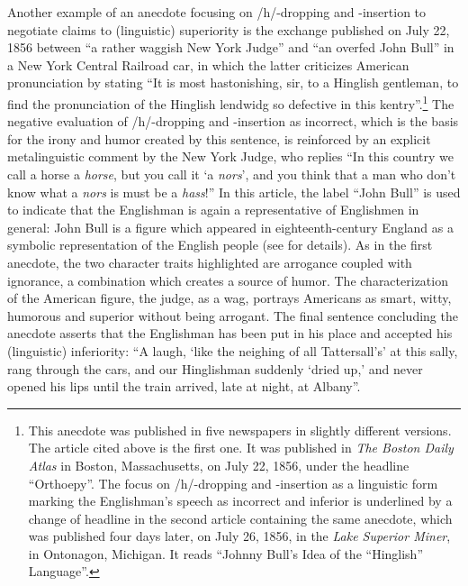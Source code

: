 Another example of an anecdote focusing on /h/-dropping and -insertion to negotiate claims to (linguistic) superiority is the exchange published on July 22, 1856 between “a rather waggish New York Judge” and “an overfed John Bull” in a New York Central Railroad car, in which the latter criticizes American pronunciation by stating “It is most hastonishing, sir, to a Hinglish gentleman, to find the pronunciation of the Hinglish lendwidg so defective in this kentry”.\footnote{This anecdote was published in five newspapers in slightly different versions. The article cited above is the first one. It was published in \emph{The Boston Daily Atlas} in Boston, Massachusetts, on July 22, 1856, under the headline “Orthoepy”. The focus on /h/-dropping and -insertion as a linguistic form marking the Englishman’s speech as incorrect and inferior is underlined by a change of headline in the second article containing the same anecdote, which was published four days later, on July 26, 1856, in the \emph{Lake Superior Miner}, in Ontonagon, Michigan. It reads “Johnny Bull’s Idea of the “Hinglish” Language”.} The negative evaluation of /h/-dropping and -insertion as incorrect, which is the basis for the irony and humor created by this sentence, is reinforced by an explicit metalinguistic comment by the New York Judge, who replies “In this country we call a horse a \emph{horse}, but you call it ‘a \emph{nors}’, and you think that a man who don’t know what a \emph{nors} is must be a \emph{hass}!” In this article, the label “John Bull” is used to indicate that the Englishman is again a representative of Englishmen in general: John Bull is a figure which appeared in eighteenth-century England as a symbolic representation of the English people (see \citealt{Hunt2003} for details). As in the first anecdote, the two character traits highlighted are arrogance coupled with ignorance, a combination which creates a source of humor. The characterization of the American figure, the judge, as a wag, portrays Americans as smart, witty, humorous and superior without being arrogant. The final sentence concluding the anecdote asserts that the Englishman has been put in his place and accepted his (linguistic) inferiority: “A laugh, ‘like the neighing of all Tattersall’s’ at this sally, rang through the cars, and our Hinglishman suddenly ‘dried up,’ and never opened his lips until the train arrived, late at night, at Albany”.

